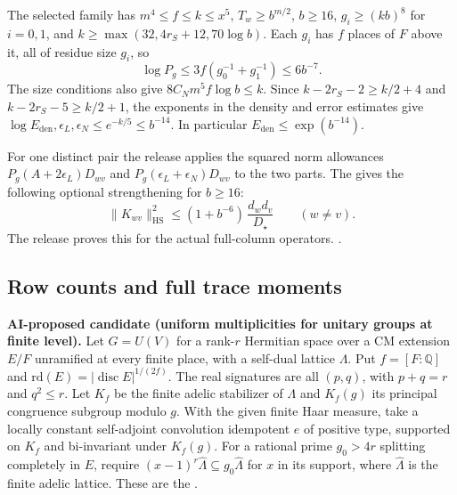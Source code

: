 The selected family has \(m^4\le f\le k\le x^5\),
\(T_w\ge b^{m/2}\), \(b\ge16\), \(g_i\ge(kb)^8\) for \(i=0,1\), and
\(k\ge\max(32,4r_S+12,70\log b)\). Each \(g_i\) has \(f\) places of
\(F\) above it, all of residue size \(g_i\), so
\[
 \log P_g\le 3f(g_0^{-1}+g_1^{-1})\le 6b^{-7}.
\]
The size conditions also give \(8C_Nm^5 f\log b\le k\).
Since \(k-2r_S-2\ge k/2+4\) and \(k-2r_S-5\ge k/2+1\),
the exponents in the density and error estimates give
\(\log E_{\mathrm{den}},\epsilon_L,\epsilon_N\le e^{-k/5}\le b^{-14}\).
In particular \(E_{\mathrm{den}}\le\exp(b^{-14})\).

\leavevmode{}%
For one distinct pair the release applies the squared norm
allowances \(P_g(A+2\epsilon_L)D_{wv}\) and
\(P_g(\epsilon_L+\epsilon_N)D_{wv}\) to the two parts. The
gives the following optional strengthening for \(b\ge16\):
\begin{equation}
 \label{eq:trace-mixed-block}
 \|K_{wv}\|_{\mathrm{HS}}^2
 \le (1+b^{-6})\,\frac{d_wd_v}{D_\star}\qquad(w\ne v).
\end{equation}
The release proves this for the actual full-column operators.
.

\subsection{Row counts and full trace moments}

\noindent\leavevmode{}%
\textbf{AI-proposed candidate (uniform multiplicities for unitary groups at finite level).}
Let \(G=U(V)\) for a rank-\(r\) Hermitian space over a CM extension
\(E/F\) unramified at every finite place, with a self-dual lattice
\(\Lambda\). Put \(f=[F:\mathbb Q]\) and
\(\mathrm{rd}(E)=|\operatorname{disc}E|^{1/(2f)}\). The real signatures
are all \((p,q)\), with \(p+q=r\) and \(q^2\le r\). Let \(K_f\) be the
finite adelic stabilizer of \(\Lambda\) and \(K_f(g)\) its principal
congruence subgroup modulo \(g\). With the given finite Haar measure,
take a locally constant self-adjoint convolution idempotent \(e\)
of positive type, supported on \(K_f\) and bi-invariant under \(K_f(g)\).
For a rational prime \(g_0>4r\) splitting completely in \(E\), require
\((x-1)^r\widehat\Lambda\subseteq g_0\widehat\Lambda\) for \(x\) in
its support, where \(\widehat\Lambda\) is the finite adelic lattice.
These are the
.

